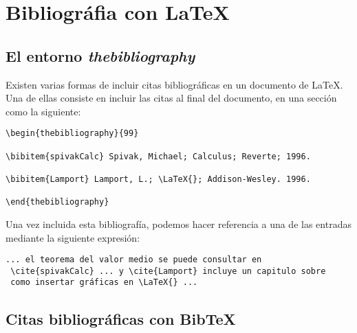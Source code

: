 \documentclass[letterpaper,12pt]{book}
\begin{document}


\appendix
\chapter{Bibliográfia con \LaTeX{}}

\section{El entorno \textit{thebibliography}}

Existen varias formas de incluir citas bibliográficas en un 
documento de \LaTeX{}. Una de ellas consiste en incluir las
citas al final del documento, en una sección como la siguiente:

\begin{verbatim}
\begin{thebibliography}{99}

\bibitem{spivakCalc} Spivak, Michael; Calculus; Reverte; 1996.

\bibitem{Lamport} Lamport, L.; \LaTeX{}; Addison-Wesley. 1996.

\end{thebibliography}
\end{verbatim}

Una vez incluida esta bibliografía, podemos hacer referencia a
una de las entradas mediante la siguiente expresión:

\begin{verbatim}
... el teorema del valor medio se puede consultar en
 \cite{spivakCalc} ... y \cite{Lamport} incluye un capitulo sobre
 como insertar gráficas en \LaTeX{} ...
\end{verbatim}

\section{Citas bibliográficas con Bib\TeX{}}
\end{document}
